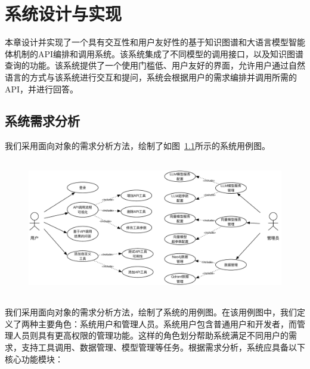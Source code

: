 \chapter{系统设计与实现}

本章设计并实现了一个具有交互性和用户友好性的基于知识图谱和大语言模型智能体机制的API编排和调用系统。该系统集成了不同模型的调用接口，以及知识图谱查询的功能。该系统提供了一个使用门槛低、用户友好的界面，允许用户通过自然语言的方式与该系统进行交互和提问，系统会根据用户的需求编排并调用所需的API，并进行回答。







\section{系统需求分析}

\indent 我们采用面向对象的需求分析方法，绘制了如图~\ref{fig:usecase}所示的系统用例图。

\begin{figure}[H]
  \vspace{1em}
  \centering
  \setlength{\abovecaptionskip}{10pt} %
  \includegraphics[height=6cm]{../assets/ch5-用例图.pdf}
  \label{fig:usecase}
\end{figure}

我们采用面向对象的需求分析方法，绘制了系统的用例图。在该用例图中，我们定义了两种主要角色：系统用户和管理人员。系统用户包含普通用户和开发者，而管理人员则具有更高权限的管理功能。这样的角色划分帮助系统满足不同用户的需求，支持工具调用、数据管理、模型管理等任务。根据需求分析，系统应具备以下核心功能模块：

